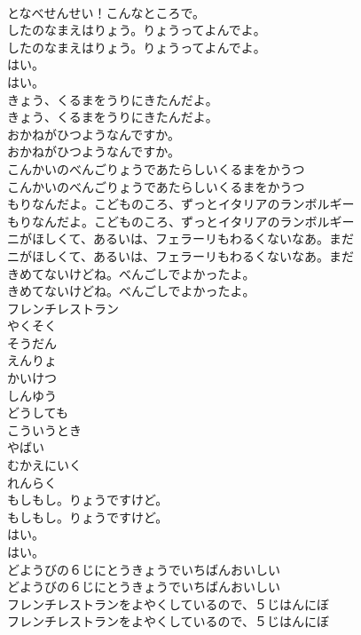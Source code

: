 \documentclass[8pt]{extreport}
\begin{document}
\begin{CJK}{UTF8}{min}
\\	となべせんせい！こんなところで。 
\\	したのなまえはりょう。りょうってよんでよ。	
\\	したのなまえはりょう。りょうってよんでよ。 
\\	はい。	
\\	はい。 
\\	きょう、くるまをうりにきたんだよ。	
\\	きょう、くるまをうりにきたんだよ。 
\\	おかねがひつようなんですか。	
\\	おかねがひつようなんですか。 
\\	こんかいのべんごりょうであたらしいくるまをかうつ	
\\	こんかいのべんごりょうであたらしいくるまをかうつ 
\\	もりなんだよ。こどものころ、ずっとイタリアのランボルギー	
\\	もりなんだよ。こどものころ、ずっとイタリアのランボルギー 
\\	ニがほしくて、あるいは、フェラーリもわるくないなあ。まだ	
\\	ニがほしくて、あるいは、フェラーリもわるくないなあ。まだ 
\\	きめてないけどね。べんごしでよかったよ。	
\\	きめてないけどね。べんごしでよかったよ。 
\\	フレンチレストラン
\\	やくそく
\\	そうだん
\\	えんりょ
\\	かいけつ
\\	しんゆう
\\	どうしても
\\	こういうとき
\\	やばい
\\	むかえにいく
\\	れんらく
\\	もしもし。りょうですけど。	
\\	もしもし。りょうですけど。 
\\	はい。	
\\	はい。 
\\	どようびの６じにとうきょうでいちばんおいしい	
\\	どようびの６じにとうきょうでいちばんおいしい 
\\	フレンチレストランをよやくしているので、５じはんにぼ	
\\	フレンチレストランをよやくしているので、５じはんにぼ 

\end{CJK}
\end{document}
